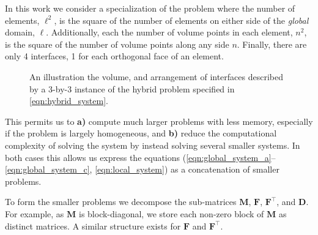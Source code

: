\begin{aside}
	In this work we consider a specialization of the problem where the 
	number of elements, $\ell^2$, is the square of the number of elements
	on either side of the \emph{global} domain, $\ell$. Additionally, 
	each the number of volume points in each element, $n^2$, is the 
	square of the number of volume points along any side $n$. Finally, 
	there are only 4 interfaces, 1 for each orthogonal face of an element.
\end{aside}

\begin{figure}
	\centering
	
	\caption{An illustration the volume, and arrangement of interfaces 
		described by a 3-by-3 instance of the hybrid problem specified 
		in \eqref{eqn:hybrid_system}.}
	\label{fig:volume_diagram}
\end{figure}

\noindent
This permits us to \textbf{a)} compute much larger problems with less 
memory, especially if the problem is largely homogeneous, and \textbf{b)} 
reduce the computational complexity of solving the system by instead 
solving several smaller systems. In both cases this allows us express the 
equations (\ref{eqn:global_system_a}--\ref{eqn:global_system_c}, 
\ref{eqn:local_system}) as a concatenation of smaller problems. 

To form the smaller problems we decompose the sub-matrices 
$\textbf{M}$, $\textbf{F}$, $\textbf{F}^{\intercal}$, and $\textbf{D}$. 
For example, as $\textbf{M}$ is block-diagonal, we store each non-zero 
block of $\textbf{M}$ as distinct matrices. A similar structure exists 
for $\textbf{F}$ and $\textbf{F}^{\intercal}$. 

